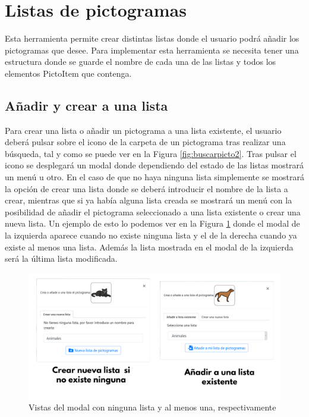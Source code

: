 \section{Listas de pictogramas}
\label{listapictos}

Esta herramienta permite crear distintas listas donde el usuario podrá añadir los pictogramas que desee.
Para implementar esta herramienta se necesita tener una estructura donde se guarde el nombre de cada una de las listas y todos los elementos PictoItem que contenga. 

\subsection{Añadir y crear a una lista}

Para crear una lista o añadir un pictograma a una lista existente, el usuario deberá pulsar sobre el icono de la carpeta de un pictograma tras realizar una búsqueda, tal y como se puede ver en la Figura \ref{fig:buscarpicto2}. Tras pulsar el icono se desplegará un modal donde dependiendo del estado de las listas mostrará un menú u otro. En el caso de que no haya ninguna lista simplemente se mostrará la opción de crear una lista donde se deberá introducir el nombre de la lista a crear, mientras que si ya había alguna lista creada se mostrará un menú con la posibilidad de añadir el pictograma seleccionado a una lista existente o crear una nueva lista. Un ejemplo de esto lo podemos ver en la Figura \ref{fig:modalescoleccion} donde el modal de la izquierda aparece cuando no existe ninguna lista y el de la derecha cuando ya existe al menos una lista. Además la lista mostrada en el modal de la izquierda será la última lista modificada.


\begin{figure}[h!]
	\centering
	\includegraphics[width=0.7\linewidth]{Imagenes/Bitmap/modalesColeccion}
	\caption{Vistas del modal con ninguna lista y al menos una, respectivamente}
	\label{fig:modalescoleccion}
\end{figure}


